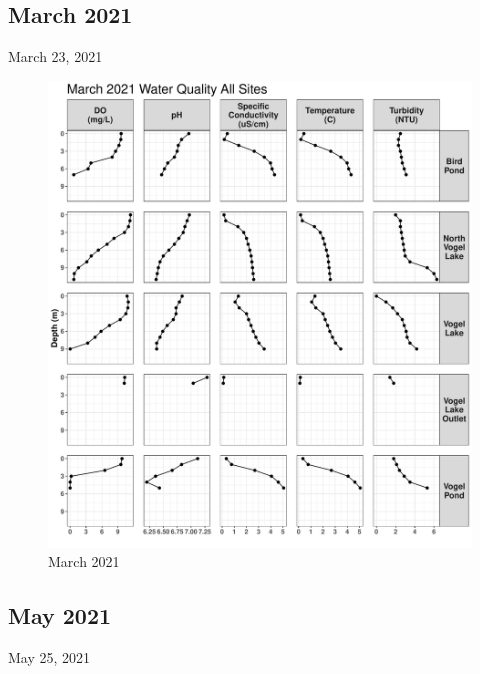 \documentclass[
]{book}
\begin{document}
\hypertarget{march-2021}{%
\subsection{March 2021}\label{march-2021}}

March 23, 2021

\begin{figure}
\centering
\includegraphics{Miller_Creek_Vogel_Lake_Water_Quality_files/figure-latex/unnamed-chunk-5-1.pdf}
\caption{\label{fig:unnamed-chunk-5}March 2021}
\end{figure}

\hypertarget{may-2021}{%
\subsection{May 2021}\label{may-2021}}

May 25, 2021
\end{document}
